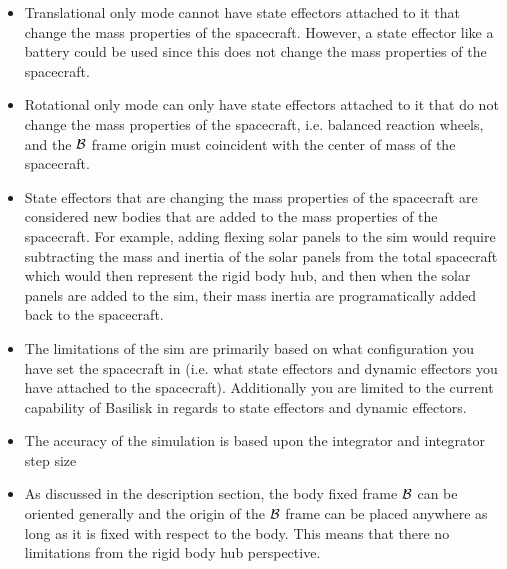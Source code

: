 \begin{itemize}
	\item Translational only mode cannot have state effectors attached to it that change the mass properties of the spacecraft. However, a state effector like a battery could be used since this does not change the mass properties of the spacecraft.
	\item Rotational only mode can only have state effectors attached to it that do not change the mass properties of the spacecraft, i.e. balanced reaction wheels, and the $\cal{B}$ frame origin must coincident with the center of mass of the spacecraft.
	\item State effectors that are changing the mass properties of the spacecraft are considered new bodies that are added to the mass properties of the spacecraft. For example, adding flexing solar panels to the sim would require subtracting the mass and inertia of the solar panels from the total spacecraft which would then represent the rigid body hub, and then when the solar panels are added to the sim, their mass inertia are programatically added back to the spacecraft.
	\item The limitations of the sim are primarily based on what configuration you have set the spacecraft in (i.e. what state effectors and dynamic effectors you have attached to the spacecraft). Additionally you are limited to the current capability of Basilisk in regards to state effectors and dynamic effectors.
	\item The accuracy of the simulation is based upon the integrator and integrator step size
	\item As discussed in the description section, the body fixed frame $\cal{B}$ can be oriented generally and the origin of the $\cal{B}$ frame can be placed anywhere as long as it is fixed with respect to the body. This means that there no limitations from the rigid body hub perspective.
\end{itemize}
